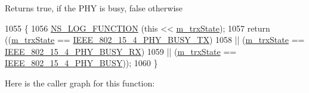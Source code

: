 \begin{DoxyReturn}{Returns}
true, if the P\+HY is busy, false otherwise 
\end{DoxyReturn}

\begin{DoxyCode}
1055 \{
1056   \hyperlink{log-macros-disabled_8h_a90b90d5bad1f39cb1b64923ea94c0761}{NS\_LOG\_FUNCTION} (\textcolor{keyword}{this} << \hyperlink{classns3_1_1LrWpanPhy_a316704a4eb96e04f4b960ba3577fe0ce}{m\_trxState});
1057   \textcolor{keywordflow}{return} ((\hyperlink{classns3_1_1LrWpanPhy_a316704a4eb96e04f4b960ba3577fe0ce}{m\_trxState} == \hyperlink{group__lr-wpan_gga6494269d13d45c511a07b7ccbb1de754a87f658959801356265b8c28a85569b15}{IEEE\_802\_15\_4\_PHY\_BUSY\_TX})
1058           || (\hyperlink{classns3_1_1LrWpanPhy_a316704a4eb96e04f4b960ba3577fe0ce}{m\_trxState} == \hyperlink{group__lr-wpan_gga6494269d13d45c511a07b7ccbb1de754a09f430974fda07ac7d4d483a1ce23b98}{IEEE\_802\_15\_4\_PHY\_BUSY\_RX})
1059           || (\hyperlink{classns3_1_1LrWpanPhy_a316704a4eb96e04f4b960ba3577fe0ce}{m\_trxState} == \hyperlink{group__lr-wpan_gga6494269d13d45c511a07b7ccbb1de754a14641e5190b66ec8ec3903218058dc46}{IEEE\_802\_15\_4\_PHY\_BUSY}));
1060 \}
\end{DoxyCode}


Here is the caller graph for this function\+:


